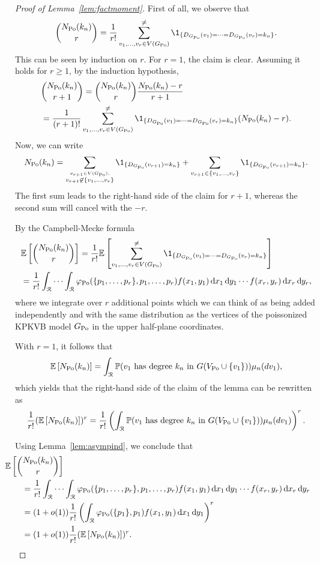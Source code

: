 \begin{proof}[Proof of Lemma~\ref{lem:factmoment}]
First of all, we observe that
\begin{align*}
{N_{\Po}(k_n) \choose r} = \frac{1}{r!} \sum_{v_1,\dots,v_r\in V(\GPo)}^{\not = } \1_{\{D_{\GPo}(v_1)=\dots=D_{\GPo}(v_r)=k_n\}}.
\end{align*}
This can be seen by induction on $r$. For $r=1$, the claim is clear. Assuming it holds for $r\geq 1$, by the induction hypothesis,
\begin{align*}
&{N_{\Po}(k_n) \choose r+1} = {N_{\Po}(k_n) \choose r} \frac{N_{\Po}(k_n)-r}{r+1} \\
&= \frac{1}{(r+1)!}\sum_{v_1,\dots,v_r\in V(\GPo)}^{\not = } \1_{\{D_{\GPo}(v_1)=\dots=D_{\GPo}(v_r)=k_n\}} (N_{\Po}(k_n)-r).
\end{align*}
Now, we can write
$$N_{\Po}(k_n) = \sum_{\stackrel{v_{r+1} \in V(\GPo),}{v_{r+1} \not \in\{ v_1,\dots,v_r\}} } \1_{\{D_{\GPo}(v_{r+1})=k_n\}}+\sum_{v_{r+1} \in \{v_1,\dots,v_r\}}\1_{\{D_{\GPo}(v_{r+1})=k_n\}}.$$
The first sum leads to the right-hand side of the claim for $r+1$, whereas the second sum will cancel with the $-r$.

By the Campbell-Mecke formula 
\begin{align*}
	&\Exp{ {N_{\Po}(k_n) \choose r}}=\frac{1}{r!} \E\left[ \sum_{v_1,\dots,v_r\in V(\GPo)}^{\not = }  
		\1_{\{D_{\GPo}(v_1)=\dots=D_{\GPo}(v_r)=k_n\}}\right] \\
	&=\frac{1}{r!} \int_\Rcal \cdots \int_\Rcal \varphi_{\Po}(\{p_1,\dots,p_r\},p_1,\dots,p_r)
		f(x_1,y_1) \dd x_1 \dd y_1 \cdots f(x_{r},y_{r})\dd x_{r} \dd y_{r},
\end{align*}
where we integrate over $r$ additional points which we can think of as being added independently and with the same distribution as the vertices of the poissonized KPKVB model $G_{{\mathrm{Po}}}$ in the upper half-plane coordinates.

With $r=1$, it follows that
\[
	\mathbb{E}\left[N_{{\mathrm{Po}}}(k_n)\right] = \int_{{\mathcal R}} \mathbb{P}(v_1 \text{ has degree }k_n\text{ in }G(V_{{\mathrm{Po}}}\cup \{v_1\})) \mu_n(dv_1),
\]
which yields that the right-hand side of the claim of the lemma can be rewritten as
\[
	\frac{1}{r!}(\mathbb{E}\left[N_{{\mathrm{Po}}}(k_n)\right])^r = \frac{1}{r!}\left(\int_{{\mathcal R}} \mathbb{P}(v_1 \text{ has degree }k_n\text{ in }G(V_{{\mathrm{Po}}}\cup \{v_1\})) \mu_n(dv_1)\right)^r.
\]

Using Lemma~\ref{lem:asympind}, we conclude that
\begin{align*}
	&\hspace{-20pt}\Exp{ { N_{\Po}(k_n) \choose r}} \\
	&= \frac{1}{r!} \int_\Rcal \cdots \int_\Rcal 
		\varphi_{\Po}(\{p_1,\dots,p_r\},p_1,\dots,p_r) 
		f(x_1,y_1) \dd x_1 \dd y_1 \cdots f(x_{r},y_{r})\dd x_{r} \dd y_{r} \\
	&= (1+o(1))\frac{1}{r!}\left(\int_\Rcal \varphi_{\Po}(\{p_1\},p_1) f(x_1,y_1) \dd x_1 \dd y_1 \right)^r \\
	&= (1+o(1))\frac{1}{r!}(\Exp{N_{\Po}(k_n)})^r.
\end{align*}
\end{proof}

